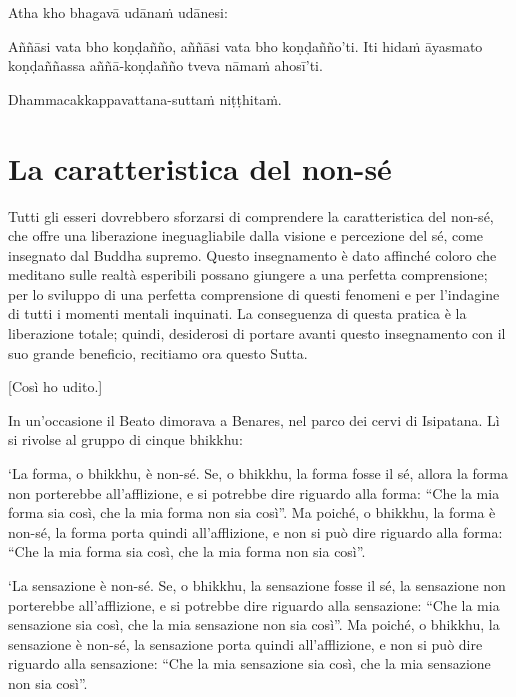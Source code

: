 Atha kho bhagavā udānaṁ udānesi:

Aññāsi vata bho koṇḍañño, aññāsi vata bho koṇḍañño'ti. Iti hidaṁ āyasmato
koṇḍaññassa aññā-koṇḍañño tveva nāmaṁ ahosī'ti.

Dhammacakkappavattana-suttaṁ niṭṭhitaṁ.

\chapterTocDelegatePageNumber
\chapter{La caratteristica del non-sé}

\setTocDelegatedPageNumber
\englishText
\renewcommand{\englishTitle}{Anatta-lakkhaṇa Sutta}

\begin{leader}


Tutti gli esseri dovrebbero sforzarsi di comprendere la caratteristica del
non-sé, che offre una liberazione ineguagliabile dalla visione e percezione del sé,
come insegnato dal Buddha supremo.
Questo insegnamento è dato affinché coloro che meditano sulle realtà esperibili
possano giungere a una perfetta comprensione;
per lo sviluppo di una perfetta comprensione di questi fenomeni
e per l'indagine di tutti i momenti mentali inquinati.
La conseguenza di questa pratica è la liberazione totale; quindi, desiderosi di
portare avanti questo insegnamento con il suo grande beneficio,
recitiamo ora questo Sutta.


\end{leader}

[Così ho udito.]

In un'occasione il Beato dimorava a Benares, nel parco dei cervi di Isipatana.
Lì si rivolse al gruppo di cinque bhikkhu:

‘La forma, o bhikkhu, è non-sé. Se, o bhikkhu, la forma fosse il sé, allora la forma
non porterebbe all'afflizione, e si potrebbe dire riguardo alla
forma: “Che la mia forma sia così, che la mia forma non sia così”. Ma poiché,
o bhikkhu, la forma è non-sé, la forma porta quindi all'afflizione, e non
si può dire riguardo alla forma: “Che la mia forma sia così, che la mia forma
non sia così”.

‘La sensazione è non-sé. Se, o bhikkhu, la sensazione fosse il sé, la sensazione
non porterebbe all'afflizione, e si potrebbe dire riguardo alla
sensazione: “Che la mia sensazione sia così, che la mia sensazione non sia così”. Ma
poiché, o bhikkhu, la sensazione è non-sé, la sensazione porta quindi
all'afflizione, e non si può dire riguardo alla sensazione: “Che la mia
sensazione sia così, che la mia sensazione non sia così”.



